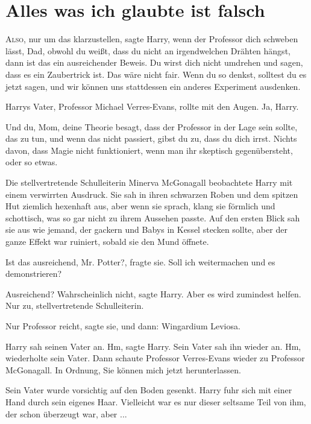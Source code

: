 \chapter{Alles was ich glaubte ist falsch}

\lettrine{\loq A}{lso}, nur um das klarzustellen\grqq{}, sagte Harry, \glqq wenn
der Professor dich schweben lässt, Dad, obwohl du weißt, dass du nicht an
irgendwelchen Drähten hängst, dann ist das ein ausreichender Beweis. Du wirst
dich nicht umdrehen und sagen, dass es ein Zaubertrick ist. Das wäre nicht
fair. Wenn du so denkst, solltest du es jetzt sagen, und wir können uns
stattdessen ein anderes Experiment ausdenken.\grqq{}

Harrys Vater, Professor Michael Verres-Evans, rollte mit den Augen. \glqq{}Ja,
Harry.\grqq{}

\glqq{}Und du, Mom, deine Theorie besagt, dass der Professor in der Lage sein
sollte, das zu tun, und wenn das nicht passiert, gibst du zu, dass du dich
irrst. Nichts davon, dass Magie nicht funktioniert, wenn man ihr skeptisch
gegenübersteht, oder so etwas.\grqq{}

Die stellvertretende Schulleiterin Minerva McGonagall beobachtete Harry mit
einem verwirrten Ausdruck. Sie sah in ihren schwarzen Roben und dem spitzen Hut
ziemlich hexenhaft aus, aber wenn sie sprach, klang sie förmlich und schottisch,
was so gar nicht zu ihrem Aussehen passte. Auf den ersten Blick sah sie aus wie
jemand, der gackern und Babys in Kessel stecken sollte, aber der ganze Effekt
war ruiniert, sobald sie den Mund öffnete.

\glqq{}Ist das ausreichend, Mr. Potter?\grqq{}, fragte sie. \glqq{}Soll ich
weitermachen und es demonstrieren?\grqq{}

\glqq{}Ausreichend? Wahrscheinlich nicht\grqq{}, sagte Harry. \glqq{}Aber es
wird zumindest helfen. Nur zu, stellvertretende Schulleiterin.\grqq{}

\glqq{}Nur Professor reicht\grqq{}, sagte sie, und dann: \glqq{}Wingardium
Leviosa.\grqq{}

Harry sah seinen Vater an. \glqq{}Hm\grqq{}, sagte Harry. Sein Vater sah ihn
wieder an. \glqq{}Hm\grqq{}, wiederholte sein Vater. Dann schaute Professor
Verres-Evans wieder zu Professor McGonagall. \glqq{}In Ordnung, Sie können mich
jetzt herunterlassen.\grqq{}

Sein Vater wurde vorsichtig auf den Boden gesenkt. Harry fuhr sich mit einer
Hand durch sein eigenes Haar. Vielleicht war es nur dieser seltsame Teil von
ihm, der schon überzeugt war, aber ...


